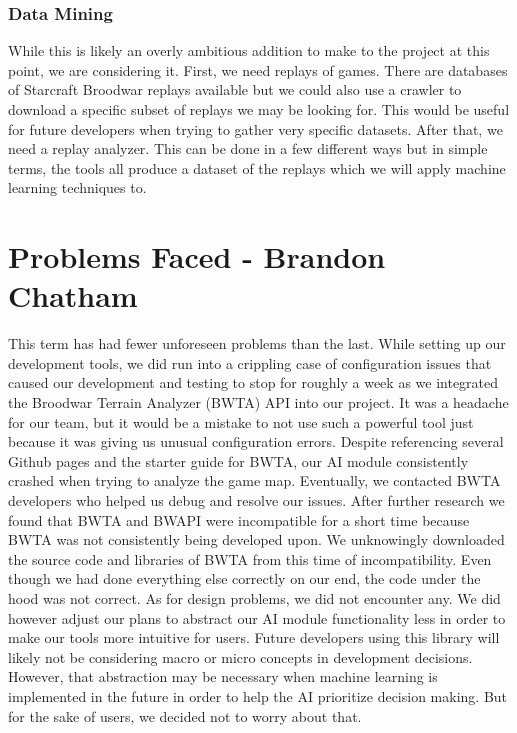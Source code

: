 \documentclass[10pt,letterpaper,onecolumn,draftclsnofoot]{IEEEtran}
\begin{document}
	\subsubsection{Data Mining}
	While this is likely an overly ambitious addition to make to the project at this point, we are considering it. First, we need replays of games. There are databases of Starcraft Broodwar replays available but we could also use a crawler to download a specific subset of replays we may be looking for. This would be useful for future developers when trying to gather very specific datasets. After that, we need a replay analyzer. This can be done in a few different ways but in simple terms, the tools all produce a dataset of the replays which we will apply machine learning techniques to.
	
	\section{Problems Faced - Brandon Chatham}
	This term has had fewer unforeseen problems than the last. While setting up our development tools, we did run into a crippling case of configuration issues that caused our development and testing to stop for roughly a week as we integrated the Broodwar Terrain Analyzer (BWTA) API into our project. It was a headache for our team, but it would be a mistake to not use such a powerful tool just because it was giving us unusual configuration errors. Despite referencing several Github pages and the starter guide for BWTA, our AI module consistently crashed when trying to analyze the game map. Eventually, we contacted BWTA developers who helped us debug and resolve our issues. After further research we found that BWTA and BWAPI were incompatible for a short time because BWTA was not consistently being developed upon. We unknowingly downloaded the source code and libraries of BWTA from this time of incompatibility. Even though we had done everything else correctly on our end, the code under the hood was not correct.
	As for design problems, we did not encounter any. We did however adjust our plans to abstract our AI module functionality less in order to make our tools more intuitive for users. Future developers using this library will likely not be considering macro or micro concepts in development decisions. However, that abstraction may be necessary when machine learning is implemented in the future in order to help the AI prioritize decision making. But for the sake of users, we decided not to worry about that. 
	
\end{document}
